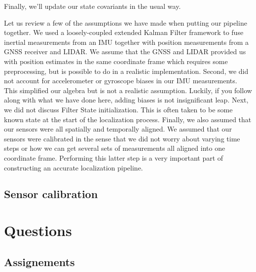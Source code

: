 Finally, we'll update our state covariants in the usual way. 


Let us review a few of the assumptions we have made when putting
our pipeline together. We used a loosely-coupled extended Kalman
Filter framework to fuse inertial
measurements from an IMU together with position measurements
from a GNSS receiver and LIDAR. We assume that the GNSS and LIDAR provided us with position estimates in the same coordinate frame which requires
some preprocessing, but is possible to do in a realistic
implementation. Second, we did not account for accelerometer or gyroscope biases in our IMU measurements. This simplified
our algebra but is not a
realistic assumption. Luckily, if you follow along with what
we have done here, adding biases is not insignificant leap. Next, we did not discuss Filter State
initialization. This is often taken to
be some known state at the start of
the localization process. Finally, we also assumed that our
sensors were all spatially and temporally aligned. We assumed that
our sensors were calibrated in the sense that we did not worry about varying time steps or how we can get several sets of
measurements all aligned into one coordinate frame. Performing
this latter step is a very important part of constructing an accurate localization pipeline. 

\subsection{Sensor calibration}
\label{sensor_calibration}
 

\section{Questions}
\label{questions_sensor_fusion}

\subsection{Assignements}
\label{assignements_sensor_fusion}



